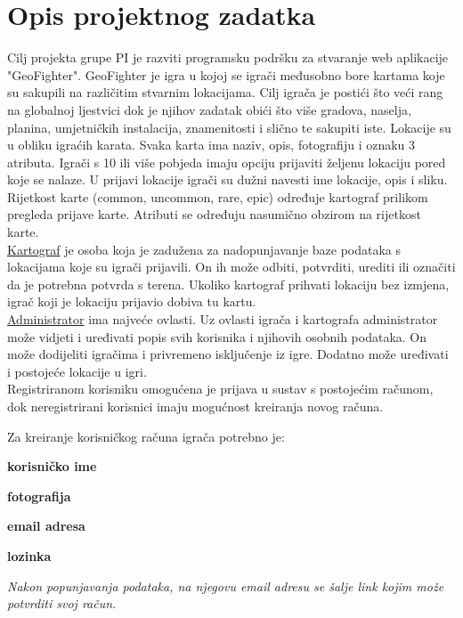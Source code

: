 \chapter{Opis projektnog zadatka}
		
		
		\textnormal{Cilj projekta grupe PI je razviti programsku podršku za stvaranje web aplikacije "GeoFighter".  GeoFighter je igra u kojoj se igrači međusobno bore kartama koje su sakupili na različitim stvarnim lokacijama. Cilj igrača je postići što veći rang na globalnoj ljestvici dok je njihov zadatak obići što više  gradova, naselja, planina, umjetničkih instalacija, znamenitosti i slično te sakupiti iste. Lokacije su u obliku igraćih karata. Svaka karta ima naziv,  opis, fotografiju i oznaku 3 atributa. Igrači s 10 ili više pobjeda imaju opciju prijaviti željenu lokaciju pored koje se nalaze. U prijavi lokacije igrači su dužni navesti ime lokacije, opis i sliku. Rijetkost karte (common, uncommon, rare, epic) određuje kartograf prilikom pregleda prijave karte. Atributi se određuju nasumično obzirom na rijetkost karte.} \\
		
		 \textnormal{\underline{Kartograf} je osoba koja je zadužena za nadopunjavanje baze podataka s lokacijama koje su igrači prijavili. On ih može odbiti, potvrditi, urediti ili označiti da je potrebna potvrda s terena. Ukoliko kartograf prihvati lokaciju bez izmjena, igrač koji je lokaciju  prijavio dobiva tu kartu.}\\
		
		\textnormal{\underline{Administrator} ima najveće ovlasti. Uz ovlasti igrača i kartografa administrator može vidjeti i uređivati popis svih korisnika i njihovih osobnih  podataka. On može dodijeliti  igračima i privremeno isključenje iz igre. Dodatno može uređivati i postojeće lokacije u igri.}\\
		
		\textnormal{Registriranom korisniku omogućena je prijava u sustav s postojećim računom, dok neregistrirani korisnici imaju mogućnost kreiranja novog računa.}
		
		\noindent\textnormal{Za kreiranje korisničkog računa igrača potrebno je:}
		\begin{packed_item}
			\item \textbf{korisničko ime}
			\item \textbf{fotografija}
			\item \textbf{email adresa}
			\item \textbf{lozinka}
		\end{packed_item}
		\textit{Nakon  popunjavanja  podataka,  na njegovu email adresu se šalje link kojim može potvrditi svoj račun.}\\
		
